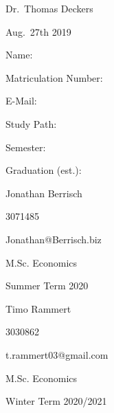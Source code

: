 \documentclass[11pt,]{article}
\begin{document}
\begin{titlepage}
  \noindent\begin{minipage}[t]{0.3\textwidth}
  \end{minipage}
  \begin{minipage}[t]{0.7\textwidth}
  \hspace{1cm}Dr.~Thomas Deckers
  \end{minipage}

  \noindent\begin{minipage}[t]{0.3\textwidth}
  \end{minipage}
  \begin{minipage}[t]{0.7\textwidth}
  \hspace{1cm}Aug.~27th 2019
  \end{minipage}

  \hrulefill

  \begin{multicols}{3}

  Name:

  Matriculation Number:

  E-Mail:

  Study Path:

  Semester:

  Graduation (est.):

  \columnbreak

  Jonathan Berrisch

  3071485

  Jonathan@Berrisch.biz

  M.Sc. Economics


  Summer Term 2020

  \columnbreak

  Timo Rammert

  3030862

  t.rammert03@gmail.com

  M.Sc. Economics


  Winter Term 2020/2021

  \end{multicols}

\end{titlepage}



{
\hypersetup{linkcolor=black}

\setcounter{tocdepth}{3}
\tableofcontents
}
\end{document}

